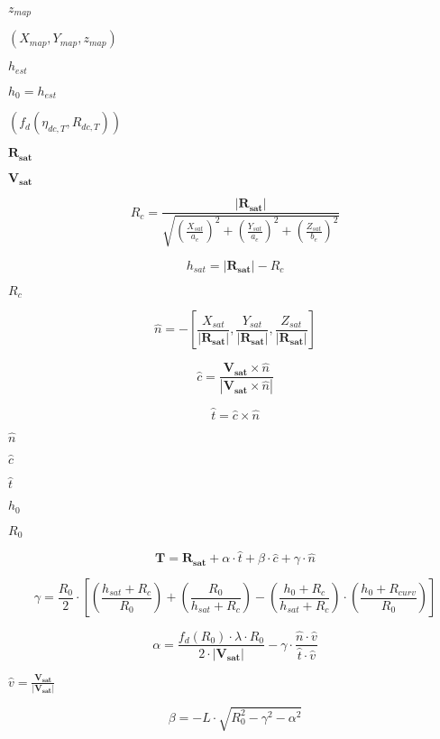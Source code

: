 \documentclass{article}
\begin{document}
$z_{map}$
\pagebreak

$\left(X_{map}, Y_{map}, z_{map}\right)$
\pagebreak

$h_{est}$
\pagebreak

$h_0 = h_{est}$
\pagebreak

$ \left( f_{d}\left(\eta_{dc,T}, R_{dc,T}\right) \right) $
\pagebreak

$\mathbf{R_{sat}}$
\pagebreak

$\mathbf{V_{sat}}$
\pagebreak

\[ R_c =\frac{\left| \mathbf{R_{sat}}\right|} {\sqrt{ \left( \frac{X_{sat}}{a_e} \right)^2 + \left( \frac{Y_{sat}}{a_e} \right)^2 + \left( \frac{Z_{sat}}{b_e} \right)^2 }} \]
\pagebreak

\[ h_{sat} = \left| \mathbf{R_{sat}} \right| - R_c \]
\pagebreak

$R_c$
\pagebreak

\[ \hat{n} = -\left[ \frac{X_{sat}}{\left| \mathbf{R_{sat}} \right|}, \frac{Y_{sat}}{\left| \mathbf{R_{sat}} \right|}, \frac{Z_{sat}}{\left| \mathbf{R_{sat}} \right|} \right] \]
\pagebreak

\[ \hat{c} = \frac{\mathbf{V_{sat}} \times \hat{n}}{\left| \mathbf{V_{sat}} \times \hat{n} \right| } \]
\pagebreak

\[ \hat{t} = \hat{c} \times \hat{n} \]
\pagebreak

$\hat{n}$
\pagebreak

$\hat{c}$
\pagebreak

$\hat{t}$
\pagebreak

$h_0$
\pagebreak

$R_0$
\pagebreak

\[ \mathbf{T} = \mathbf{R_{sat}} + \alpha \cdot \hat{t} + \beta \cdot \hat{c} + \gamma \cdot \hat{n} \]
\pagebreak

\[ \gamma = \frac{R_0}{2} \cdot \left[ \left( \frac{h_{sat} + R_c}{R_0}\right) + \left( \frac{R_0}{h_{sat} + R_c } \right) - \left( \frac{h_0 + R_c}{h_{sat}+R_c} \right) \cdot \left( \frac{h_0 + R_{curv}}{R_0} \right) \right] \]
\pagebreak

\[ \alpha = \frac{f_d\left(R_0\right) \cdot \lambda \cdot R_0}{2 \cdot \left| \mathbf{V_{sat}} \right|} - \gamma \cdot \frac{\hat{n} \cdot \hat{v}}{\hat{t} \cdot \hat{v}} \]
\pagebreak

$\hat{v} = \frac{\mathbf{V_{sat}}}{\left| \mathbf{V_{sat}} \right|}$
\pagebreak

\[ \beta = -L\cdot \sqrt{R_0^2 - \gamma^2 - \alpha^2} \]
\pagebreak
\end{document}
